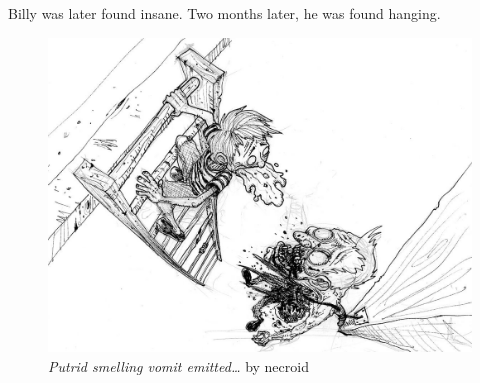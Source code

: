 Billy was later found insane. Two months later, he was found hanging.

\begin{figure}[b]
  \includegraphics[width=\textwidth]{art/necroid-putrid_smelling_vomit.jpg}
  \caption{{\em Putrid smelling vomit emitted\ldots} by necroid}
\end{figure}
